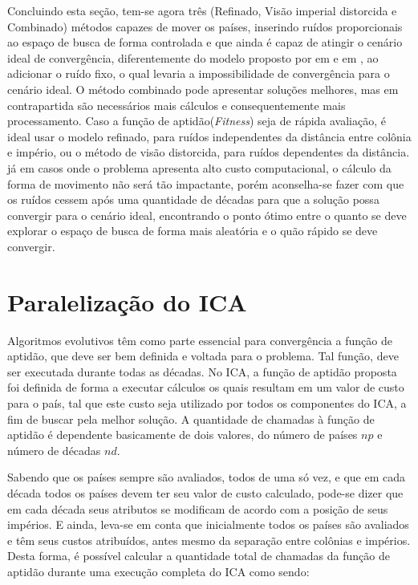 Concluindo esta seção, tem-se agora três (Refinado, Visão imperial distorcida e Combinado) métodos capazes de mover os países, inserindo ruídos proporcionais ao espaço de busca de forma controlada e que ainda é capaz de atingir o cenário ideal de convergência, diferentemente do modelo proposto por \citeauthor{atashpaz2007imperialist} em \cite{atashpaz2007imperialist} e \citeauthor{roche2011imperialist} em \cite{roche2011imperialist}, ao adicionar o ruído fixo, o qual levaria a impossibilidade de convergência para o cenário ideal. O método combinado pode apresentar soluções melhores, mas em contrapartida são necessários mais cálculos e consequentemente mais processamento. Caso a função de aptidão(\emph{Fitness}) seja de rápida avaliação, é ideal usar o modelo refinado, para ruídos independentes da distância entre colônia e império, ou o método de visão distorcida, para ruídos dependentes da distância. já em casos onde o problema apresenta alto custo computacional, o cálculo da forma de movimento não será tão impactante, porém aconselha-se fazer com que os ruídos cessem após uma quantidade de décadas para que a solução possa convergir para o cenário ideal, encontrando o ponto ótimo entre o quanto se deve explorar o espaço de busca de forma mais aleatória e o quão rápido se deve convergir. 






\section{Paralelização do ICA}
\label{Paralelização do ICA}


Algoritmos evolutivos têm como parte essencial para convergência a função de aptidão, que deve ser bem definida e voltada para o problema. Tal função, deve ser executada durante todas as décadas. No ICA, a função de aptidão proposta foi definida de forma a executar cálculos os quais resultam em um valor de custo para o país, tal que este custo seja utilizado por todos os componentes do ICA, a fim de buscar pela melhor solução. A quantidade de chamadas à função de aptidão é dependente basicamente de dois valores, do número de países \(np\) e número de décadas \(nd\). 


Sabendo que os países sempre são avaliados, todos de uma só vez, e que em cada década todos os países devem ter seu valor de custo calculado, pode-se dizer que em cada década seus atributos se modificam de acordo com a posição de seus impérios. E ainda, leva-se em conta que inicialmente todos os países são avaliados e têm seus custos atribuídos, antes mesmo da separação entre colônias e impérios. Desta forma, é possível calcular a quantidade total de chamadas da função de aptidão durante uma execução completa do ICA como sendo:


